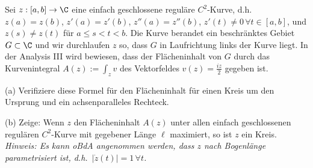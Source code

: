 \begin{prob}
Sei $z:[a,b]\to\C$ eine einfach geschlossene regul\"are $C^2$-Kurve,
d.h.~$z(a)=z(b)$, $z'(a)=z'(b)$, $z''(a)=z''(b)$, $z'(t)\neq
0\,\forall t\in[a,b]$, und $z(s)\neq z(t)$ f\"ur $a\leq s<t<b$. Die
Kurve berandet ein beschr\"anktes Gebiet $G\subset \C$ und wir
durchlaufen $z$ so, dass $G$ in Laufrichtung links der Kurve liegt.  
In der Analysis III wird bewiesen, dass der Fl\"acheninhalt von $G$ durch das
Kurvenintegral $A(z):=\int_zv$ des Vektorfeldes $v(z)=\frac{iz}{2}$ gegeben ist.

(a) Verifiziere diese Formel f\"ur den Fl\"acheninhalt f\"ur einen
Kreis um den Ursprung und ein achsenparalleles Rechteck. 

(b) Zeige: Wenn $z$ den Fl\"acheninhalt $A(z)$ unter allen einfach
geschlossenen regul\"aren $C^2$-Kurve mit gegebener L\"ange $\ell$
maximiert, so ist $z$ ein Kreis.
{\em Hinweis: Es kann oBdA angenommen werden, dass $z$ nach
  Bogenl\"ange parametrisiert ist, d.h.~$|\dot z(t)|=1\,\forall t$.}
\end{prob}
